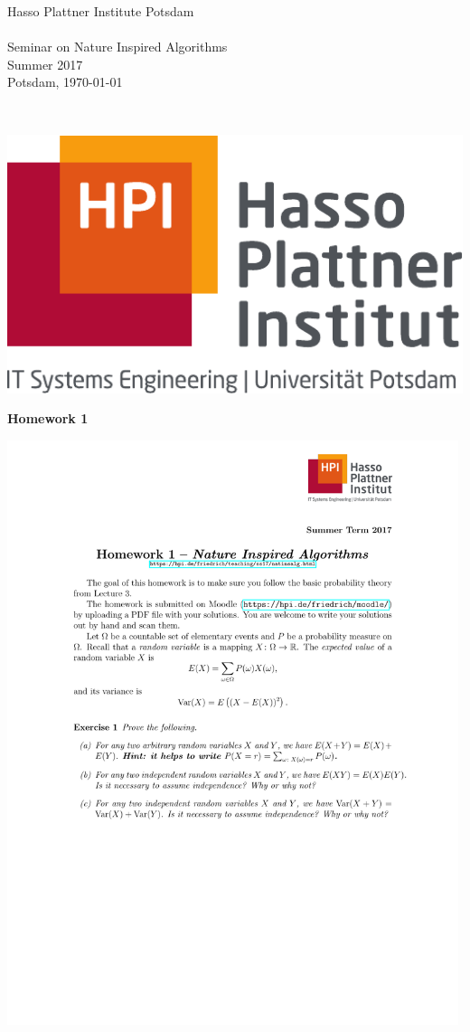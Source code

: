 \documentclass[12pt,a4paper]{article}
\begin{document}
\noindent
\begin{minipage}{0.66\textwidth}
Hasso Plattner Institute Potsdam\\
\\
Seminar on Nature Inspired Algorithms\\ Summer 2017\\
Potsdam, \today
\end{minipage}
~
\begin{minipage}{0.30\textwidth}
\includegraphics[width=\textwidth]{../homework_template/Hasso_Plattner_Institut_Logo}
\end{minipage}


\begin{center}
 {\LARGE \textbf{Homework 1}}
 \vspace*{0.5cm}
\end{center}


\includegraphics[clip, trim=0.5cm 2.5cm 0.5cm 4cm, width=0.99\textwidth]{homework01.pdf}
\end{document}
